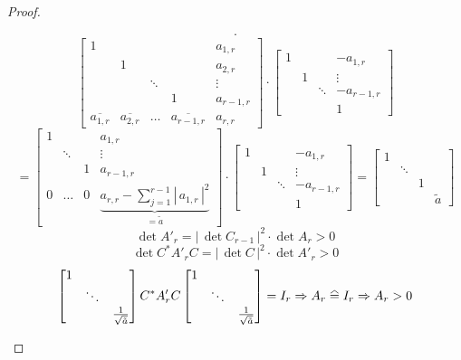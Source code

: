\documentclass[a4paper,landscape,twocolumn]{article}
\newcommand\abs[1]{|\,#1\,|}
\newcommand\equalhat{\mathrel{\stackon[1.5pt]{=}{\stretchto{%
    \scalerel*[\widthof{=}]{\wedge}{\rule{1ex}{3ex}}}{0.5ex}}}}
\begin{document}
\begin{proof}
\begin{description}
\[        \cdot
      \] \[
        \begin{bmatrix}
          1 &   &        &   & a_{1,r} \\
            & 1 &        &   & a_{2,r} \\
            &   & \ddots &   & \vdots \\
            &   &        & 1 & a_{r-1,r} \\
          \overline{a_{1,r}} & \overline{a_{2,r}} & \ldots & \overline{a_{r-1,r}} & a_{r,r}
        \end{bmatrix}
        \cdot
        \begin{bmatrix}
          1 &   &        & -a_{1,r} \\
            & 1 &        & \vdots \\
            &   & \ddots & -a_{r-1,r} \\
            &   &        & 1
        \end{bmatrix}
      \] \[
        =
        \begin{bmatrix}
          1 &        &   & a_{1,r} \\
            & \ddots &   & \vdots \\
            &        & 1 & a_{r-1,r} \\
          0 & \ldots & 0 & \underbrace{a_{r,r} - \sum_{j=1}^{r-1} \abs{a_{1,r}}^2}_{= \tilde{a}}
        \end{bmatrix}
        \cdot
        \begin{bmatrix}
          1 &   &        & -a_{1,r} \\
            & 1 &        & \vdots \\
            &   & \ddots & -a_{r-1,r} \\
            &   &        & 1
        \end{bmatrix}
        = \begin{bmatrix}
          1 &        &   &           \\
            & \ddots &   &           \\
            &        & 1 &           \\
            &        &   & \tilde{a}
        \end{bmatrix}
      \] \[
        \det{A'_r} = \abs{\det{C_{r-1}}}^2 \cdot \det{A_r} > 0
      \] \[
        \det{C^* A'_r C} = \abs{\det{C}}^2 \cdot \det{A'_r} > 0
      \] \[
        \begin{bmatrix}
          1 &        & \\
            & \ddots & \\
            &        & \frac{1}{\sqrt{\tilde{a}}}
        \end{bmatrix}
        C^* A'_r C
        \begin{bmatrix}
          1 &        & \\
            & \ddots & \\
            &        & \frac{1}{\sqrt{\tilde{a}}}
        \end{bmatrix}
        = I_r
        \Rightarrow A_r \equalhat I_r \Rightarrow A_r > 0
      \]
  \end{description}
\end{proof}
\end{document}
